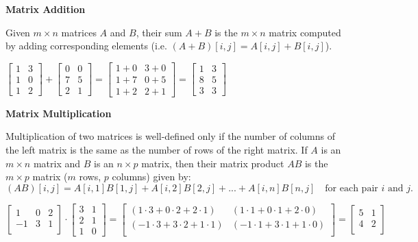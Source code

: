 \textbf{\large Matrix Addition}

Given $m\times n$ matrices $A$ and $B$, their sum $A + B$ is the $m\times n$
matrix computed by adding corresponding elements (i.e. $(A + B)[i, j] = A[i, j]
+ B[i, j]$).

\example $\begin{bmatrix} 1 & 3 \\ 1 & 0 \\ 1 & 2 \end{bmatrix} + \begin{bmatrix} 0 & 0 \\
  7 & 5 \\ 2 & 1 \end{bmatrix} = \begin{bmatrix} 1+0 & 3+0 \\ 1+7 & 0+5 \\ 1+2 &
  2+1 \end{bmatrix} = \begin{bmatrix} 1 & 3 \\ 8 & 5 \\ 3 & 3 \end{bmatrix}$\vspace{.5cm}


\textbf{\large Matrix Multiplication}

Multiplication of two matrices is well-defined only if the number of columns of
the left matrix is the same as the number of rows of the right matrix. If $A$ is
an $m\times n$ matrix and $B$ is an $n\times p$ matrix, then their matrix
product $AB$ is the $m\times p$ matrix ($m$ rows, $p$ columns) given by:
\[(AB)[i,j] = A[i,1] B[1,j] + A[i,2] B[2,j] + ... + A[i,n] B[n,j]\quad \mbox{for each pair $i$ and $j$.}\]


\example $\begin{bmatrix} 1 & 0 & 2 \\ -1 & 3 & 1 \\ \end{bmatrix} \cdot \begin{bmatrix}
  3 & 1 \\ 2 & 1 \\ 1 & 0 \end{bmatrix} = \begin{bmatrix} (1 \cdot 3 + 0 \cdot
  2 + 2 \cdot 1) & (1 \cdot 1 + 0 \cdot 1 + 2 \cdot 0) \\ (-1 \cdot 3 + 3
  \cdot 2 + 1 \cdot 1) & (-1 \cdot 1 + 3 \cdot 1 + 1 \cdot 0) \\
\end{bmatrix} = \begin{bmatrix} 5 & 1 \\ 4 & 2 \\ \end{bmatrix}$\vspace*{.5cm}

